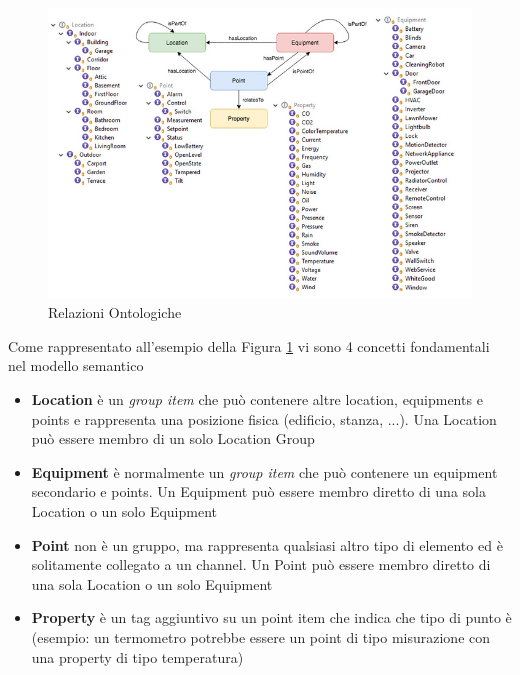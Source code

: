 \begin{figure}
    \centering
    \includegraphics[width=12cm]{Immagini/ontology_relationships}
    \caption{Relazioni Ontologiche}
    \label{fig:ontology_relationships}
\end{figure}

Come rappresentato all'esempio della Figura \ref{fig:ontology_relationships} vi sono 4 concetti fondamentali nel modello semantico
\begin{itemize}
    \item \textbf{Location} è un {\em group item} che può contenere altre location, equipments e points e rappresenta una posizione fisica (edificio, stanza, ...). Una Location può essere membro di un solo Location Group
    \item \textbf{Equipment} è normalmente un {\em group item} che può contenere un equipment secondario e points. Un Equipment può essere membro diretto di una sola Location o un solo Equipment
    \item \textbf{Point} non è un gruppo, ma rappresenta qualsiasi altro tipo di elemento ed è solitamente collegato a un channel. Un Point può essere membro diretto di una sola Location o un solo Equipment
    \item \textbf{Property} è un tag aggiuntivo su un point item che indica che tipo di punto è (esempio: un termometro potrebbe essere un point di tipo misurazione con una property di tipo temperatura)
\end{itemize}

